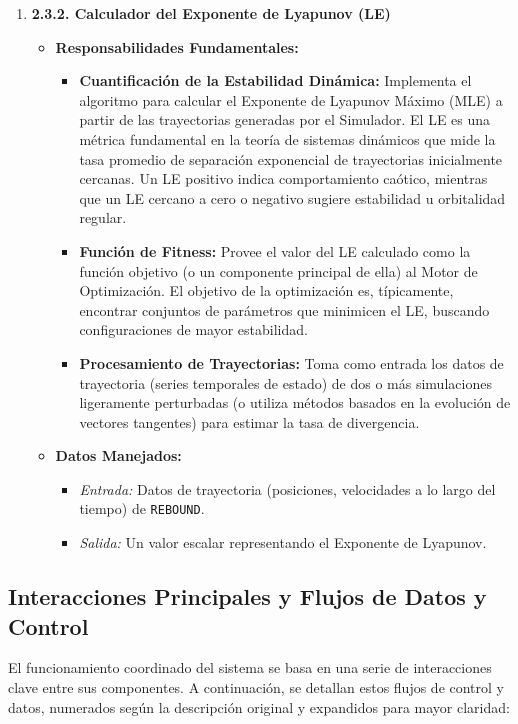 \begin{enumerate}
    \item \textbf{2.3.2. Calculador del Exponente de Lyapunov (LE)}
    \begin{itemize}
        \item \textbf{Responsabilidades Fundamentales:}
        \begin{itemize}
            \item \textbf{Cuantificación de la Estabilidad Dinámica:} Implementa el algoritmo para calcular el Exponente de Lyapunov Máximo (MLE) a partir de las trayectorias generadas por el Simulador. El LE es una métrica fundamental en la teoría de sistemas dinámicos que mide la tasa promedio de separación exponencial de trayectorias inicialmente cercanas. Un LE positivo indica comportamiento caótico, mientras que un LE cercano a cero o negativo sugiere estabilidad u orbitalidad regular.
            \item \textbf{Función de Fitness:} Provee el valor del LE calculado como la función objetivo (o un componente principal de ella) al Motor de Optimización. El objetivo de la optimización es, típicamente, encontrar conjuntos de parámetros que minimicen el LE, buscando configuraciones de mayor estabilidad.
            \item \textbf{Procesamiento de Trayectorias:} Toma como entrada los datos de trayectoria (series temporales de estado) de dos o más simulaciones ligeramente perturbadas (o utiliza métodos basados en la evolución de vectores tangentes) para estimar la tasa de divergencia.
        \end{itemize}
        \item \textbf{Datos Manejados:}
        \begin{itemize}
            \item \textit{Entrada:} Datos de trayectoria (posiciones, velocidades a lo largo del tiempo) de \texttt{REBOUND}.
            \item \textit{Salida:} Un valor escalar representando el Exponente de Lyapunov.
        \end{itemize}
    \end{itemize}
\end{enumerate}

\subsection{Interacciones Principales y Flujos de Datos y Control}

El funcionamiento coordinado del sistema se basa en una serie de interacciones clave entre sus componentes. A continuación, se detallan estos flujos de control y datos, numerados según la descripción original y expandidos para mayor claridad:

